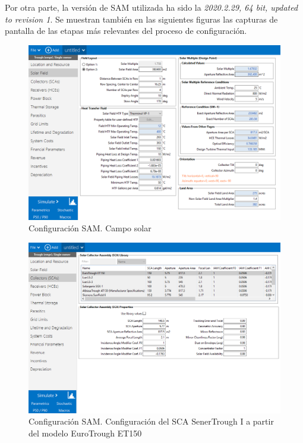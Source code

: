 Por otra parte, la versión de SAM utilizada ha sido la \emph{2020.2.29, 64 bit, updated to revision 1}. Se muestran también en las siguientes figuras las capturas de pantalla de las etapas más relevantes del proceso de configuración.

\begin{figure}
\includegraphics[scale=0.8]{images/captura_sam01.png}
\caption{Configuración SAM. Campo solar} 
\label{fig:captura01}
\end{figure}

\begin{figure}
\includegraphics[scale=0.8]{images/captura_sam02.png}
\caption{Configuración SAM. Configuración del SCA SenerTrough I a partir del modelo EuroTrough ET150} 
\label{fig:captura02}
\end{figure}

